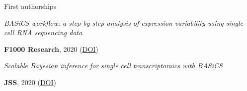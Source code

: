 


\begin{cventries}


\cventry
{First authorships} %
{} %
{} %
{} %
{ %
    \begin{cvitems}
        \item {
            \begin{flushleft}
                \textit{
                    BASiCS workflow: a step-by-step analysis of expression 
                    variability using single cell RNA sequencing data
                }
            \end{flushleft}
            \textbf{F1000 Research}, 2020
            (\href{not yet}{DOI})
        }
        \item {
            \begin{flushleft}
                \textit{
                    Scalable Bayesian inference for single cell transcriptomics
                    with BASiCS
                }
            \end{flushleft}
            \textbf{JSS}, 2020
            (\href{not yet}{DOI})
        }
    \end{cvitems}
}


\end{cventries}
